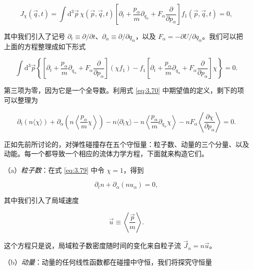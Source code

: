 \begin{equation}\label{eq:3.77}
  J_\chi(\vec q,t)=\int \mathrm{d}^3\vec p\,\chi(\vec p,\vec q,t)\left[\partial_t+\frac{p_\alpha}{m}\partial_{q_\alpha}+F_\alpha\frac{\partial}{\partial p_\alpha}\right]f_1(\vec p,\vec q,t)=0,
\end{equation}

其中我们引入了记号 $\partial_t\equiv\partial/\partial t$、$\partial_\alpha\equiv\partial/\partial q_\alpha$，以及 $F_\alpha=-\partial U/\partial q_\alpha$。我们可以把上面的方程整理成如下形式

\begin{equation}\label{eq:3.78}
  \int \mathrm{d}^3\vec p\left\{\left[\partial_t+\frac{p_\alpha}{m}\partial_{q_\alpha}+F_\alpha\frac{\partial}{\partial p_\alpha}\right](\chi f_1)-f_1\left[\partial_t+\frac{p_\alpha}{m}\partial_{q_\alpha}+F_\alpha\frac{\partial}{\partial p_\alpha}\right]\chi\right\}=0.
\end{equation}

第三项为零，因为它是一个全导数。利用式 \eqref{eq:3.70} 中期望值的定义，剩下的项可以整理为

\begin{equation}\label{eq:3.79}
  \partial_t\left(n\langle\chi\rangle\right)+\partial_\alpha\left(n\left\langle\frac{p_\alpha}{m}\chi\right\rangle\right)-n\langle\partial_t\chi\rangle-n\left\langle\frac{p_\alpha}{m}\partial_{q_\alpha}\chi\right\rangle-nF_\alpha\left\langle\frac{\partial\chi}{\partial p_\alpha}\right\rangle=0.
\end{equation}

正如先前所讨论的，对弹性碰撞存在五个守恒量：粒子数、动量的三个分量、以及动能。每一个都导致一个相应的流体力学方程，下面就来构造它们。

（a）\emph{粒子数}：在式 \eqref{eq:3.79} 中令 $\chi=1$，得到

\begin{equation}\label{eq:3.80}
  \partial_t n+\partial_\alpha\left(nu_\alpha\right)=0,
\end{equation}

其中我们引入了局域速度

\begin{equation}\label{eq:3.81}
  \vec u\equiv\left\langle\frac{\vec p}{m}\right\rangle.
\end{equation}

这个方程只是说，局域粒子数密度随时间的变化来自粒子流 $\vec J_n=n\vec u$。

（b）\emph{动量}：动量的任何线性函数都在碰撞中守恒，我们将探究守恒量

